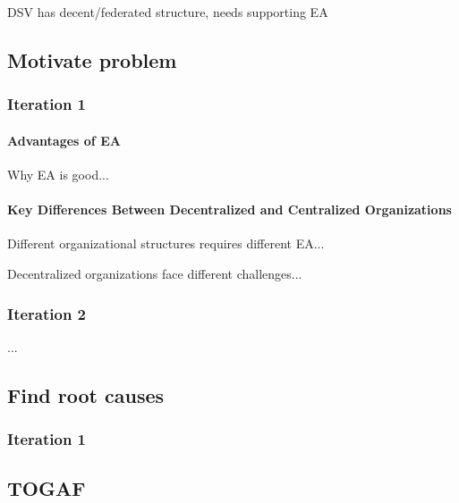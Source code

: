 DSV has decent/federated structure, needs supporting EA


\subsection{Motivate problem}

\subsubsection*{Iteration 1}

\paragraph*{Advantages of EA}

Why EA is good... 

\paragraph*{Key Differences Between Decentralized and Centralized Organizations}

Different organizational structures requires different EA...
 
Decentralized organizations face different challenges...
  
\subsubsection*{Iteration 2}

...


\subsection{Find root causes}

\subsubsection*{Iteration 1}

\subsection{TOGAF}


